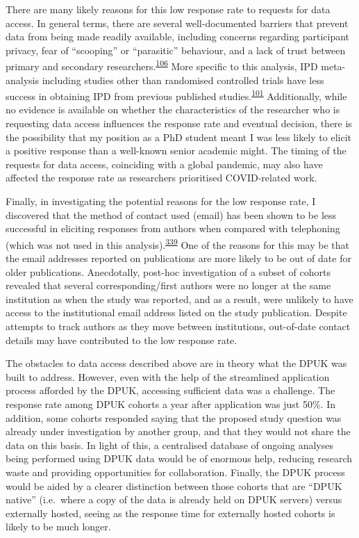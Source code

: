 \documentclass[a4paper, twoside]{templates/ociamthesis}
\begin{document}
There are many likely reasons for this low response rate to requests for data access. In general terms, there are several well-documented barriers that prevent data from being made readily available, including concerns regarding participant privacy, fear of ``scooping'' or ``parasitic'' behaviour, and a lack of trust between primary and secondary researchers.\textsuperscript{\protect\hyperlink{ref-vanpanhuis2014}{106}} More specific to this analysis, IPD meta-analysis including studies other than randomised controlled trials have less success in obtaining IPD from previous published studies.\textsuperscript{\protect\hyperlink{ref-nevitt2017}{101}} Additionally, while no evidence is available on whether the characteristics of the researcher who is requesting data access influences the response rate and eventual decision, there is the possibility that my position as a PhD student meant I was less likely to elicit a positive response than a well-known senior academic might. The timing of the requests for data access, coinciding with a global pandemic, may also have affected the response rate as researchers prioritised COVID-related work.

Finally, in investigating the potential reasons for the low response rate, I discovered that the method of contact used (email) has been shown to be less successful in eliciting responses from authors when compared with telephoning (which was not used in this analysis).\textsuperscript{\protect\hyperlink{ref-danko2019}{339}} One of the reasons for this may be that the email addresses reported on publications are more likely to be out of date for older publications. Anecdotally, post-hoc investigation of a subset of cohorts revealed that several corresponding/first authors were no longer at the same institution as when the study was reported, and as a result, were unlikely to have access to the institutional email address listed on the study publication. Despite attempts to track authors as they move between institutions, out-of-date contact details may have contributed to the low response rate.

The obstacles to data access described above are in theory what the DPUK was built to address. However, even with the help of the streamlined application process afforded by the DPUK, accessing sufficient data was a challenge. The response rate among DPUK cohorts a year after application was just 50\%. In addition, some cohorts responded saying that the proposed study question was already under investigation by another group, and that they would not share the data on this basis. In light of this, a centralised database of ongoing analyses being performed using DPUK data would be of enormous help, reducing research waste and providing opportunities for collaboration. Finally, the DPUK process would be aided by a clearer distinction between those cohorts that are ``DPUK native'' (i.e.~where a copy of the data is already held on DPUK servers) versus externally hosted, seeing as the response time for externally hosted cohorts is likely to be much longer.
\end{document}
